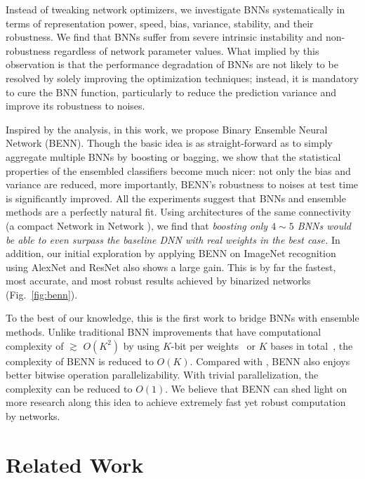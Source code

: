 \documentclass[10pt,twocolumn,letterpaper]{article}
\begin{document}
Instead of tweaking network optimizers, we investigate BNNs systematically in terms of representation power, speed, bias, variance, stability, and their robustness. We find that BNNs suffer from severe intrinsic instability and non-robustness regardless of network parameter values. What implied by this observation is that the performance degradation of BNNs are not likely to be resolved by solely improving the optimization techniques; instead, it is mandatory to cure the BNN function, particularly to reduce the prediction variance and improve its robustness to noises.

Inspired by the analysis, in this work, we propose Binary Ensemble Neural Network (BENN). Though the basic idea is as straight-forward as to simply aggregate multiple BNNs by boosting or bagging, we show that the statistical properties of the ensembled classifiers become much nicer: not only the bias and variance are reduced, more importantly, BENN's robustness to noises at test time is significantly improved. All the experiments suggest that BNNs and ensemble methods are a perfectly natural fit. Using architectures of the same connectivity (a compact Network in Network \cite{lin2013network}), we find that \emph{boosting only $4 \sim 5$ BNNs would be able to even surpass the baseline DNN with real weights in the best case.} In addition, our initial exploration by applying BENN on ImageNet recognition using AlexNet \cite{krizhevsky2012imagenet} and ResNet \cite{he2016deep} also shows a large gain. This is by far the fastest, most accurate, and most robust results achieved by binarized networks (Fig.~\ref{fig:benn}).

To the best of our knowledge, this is the first work to bridge BNNs with ensemble methods. Unlike traditional BNN improvements that have computational complexity of $\gtrsim$ $O(K^{2})$ by using $K$-bit per weights~\cite{zhou2016dorefa} or $K$ bases in total~\cite{lin2017towards}, the complexity of BENN is reduced to $O(K)$. Compared with \cite{zhou2016dorefa, lin2017towards}, BENN also enjoys better bitwise operation parallelizability. With trivial parallelization, the complexity can be reduced to $O(1)$.  We believe that BENN can shed light on more research along this idea to achieve extremely fast yet robust computation by networks. 

\section{Related Work}
\end{document}
